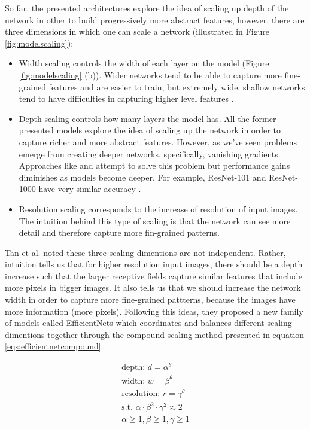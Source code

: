 So far, the presented architectures explore the idea of scaling up depth of the network in other to build progressively more abstract features, however, there are three dimensions in which one can scale a network  (illustrated in Figure \ref{fig:modelscaling}): 
\begin{itemize}
    \item Width scaling controls the width of each layer on the model (Figure \ref{fig:modelscaling} (b)). Wider networks tend to be able to capture more fine-grained features and are easier to train, but extremely wide, shallow networks tend to have difficulties in capturing higher level features \cite{efficientnet}.
    \item Depth scaling controls how many layers the model has. All the former presented models explore the idea of scaling up the network in order to capture richer and more abstract features. However, as we've seen problems emerge from creating deeper networks, specifically, vanishing gradients. Approaches like \cite{resnet} and \cite{densenet} attempt to solve this problem but performance gains diminishes as models become deeper. For example, ResNet-101 and ResNet-1000 have very similar accuracy \cite{resnet}.
    \item Resolution scaling corresponds to the increase of resolution of input images. The intuition behind this type of scaling is that the network can see more detail and therefore capture more fin-grained patterns. 
\end{itemize}
Tan et al. noted these three scaling dimentions are not independent. Rather, intuition tells us that for higher resolution input images, there should be a depth increase such that the larger receptive fields capture similar features that include more pixels in bigger images. It also tells us that we should increase the network width in order to capture more fine-grained pattterns, because the images have more information (more pixels). Following this ideas, they proposed a new family of models called EfficientNets \cite{efficientnet} which coordinates and balances different scaling dimentions together through the compound scaling method presented in equation \ref{eqs:efficientnetcompound}. \par
\begin{equation}
    \begin{split}
        \text{depth: } d = \alpha^\theta \\
        \text{width: } w = \beta^\theta \\
        \text{resolution: } r = \gamma^\theta \\
        \text{s.t. } \alpha\cdot\beta^2\cdot\gamma^2\approx2 \\
        \alpha \geq 1, \beta \geq 1, \gamma \geq 1
        \label{eqs:efficientnetcompound}
    \end{split}
\end{equation}

